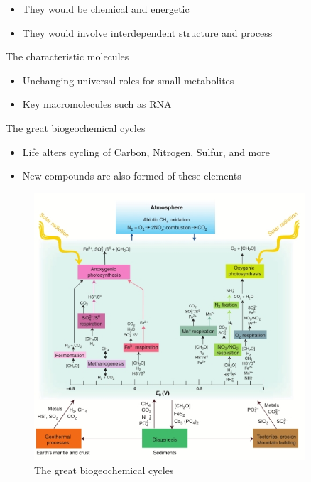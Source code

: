 \documentclass[]{article}
\begin{document}
\begin{itemize}
	\item They would be chemical and energetic
	\item They would involve interdependent	structure and process
\end{itemize}

The characteristic molecules
\begin{itemize}
	\item Unchanging universal roles 	for small metabolites
	\item Key macromolecules such as RNA
\end{itemize}

The great biogeochemical cycles
\begin{itemize}
	\item Life alters cycling of Carbon, Nitrogen, Sulfur, and more
	\item New compounds are also formed of 	these elements
\end{itemize}

\begin{figure}[H]
	\caption[The great biogeochemical cycles]{The great biogeochemical cycles\cite{falkowski2008microbial}}\label{fig:biogeochemical} 
	\includegraphics[width=0.9\textwidth]{biogeochemical}
\end{figure}
\end{document}
